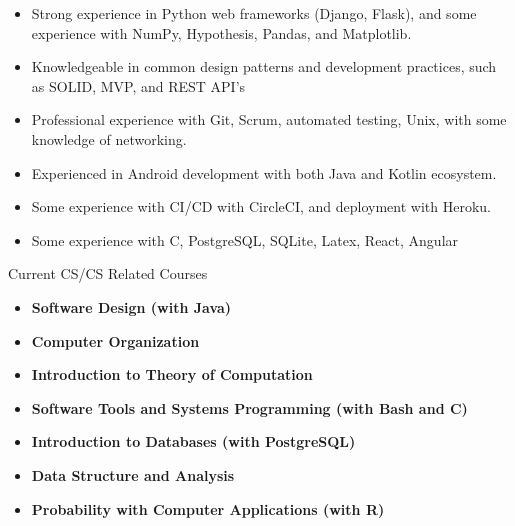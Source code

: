 \begin{itemize}
\item Strong experience in Python web frameworks (Django, Flask), and some experience with NumPy, Hypothesis, Pandas, and Matplotlib.
\item Knowledgeable in common design patterns and development practices, such as SOLID, MVP, and REST API’s
\item Professional experience with Git, Scrum, automated testing, Unix, with some knowledge of networking.
\item Experienced in Android development with both Java and Kotlin ecosystem.
\item Some experience with CI/CD with CircleCI, and deployment with Heroku.
\item Some experience with C, PostgreSQL, SQLite, Latex, React, Angular
\end{itemize}





Current CS/CS Related Courses \\[4pt]
\begin{itemize}
\item \textbf{Software Design (with Java)}
\item \textbf{Computer Organization}
\item \textbf{Introduction to Theory of Computation}
\item \textbf{Software Tools and Systems Programming (with Bash and C)}
\item \textbf{Introduction to Databases (with PostgreSQL)}
\item \textbf{Data Structure and Analysis}
\item \textbf{Probability with Computer Applications (with R)}
\end{itemize}



\divider


\divider

